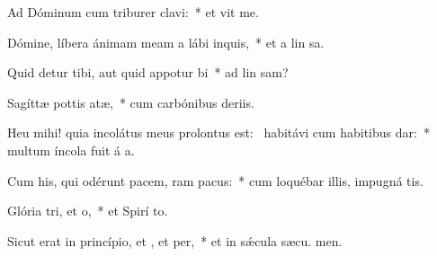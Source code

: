 \item Ad Dóminum cum triburer clavi:~* et vit me.
\item Dómine, líbera ánimam meam a lábi inquis,~* et a lin sa.
\item Quid detur tibi, aut quid appotur bi~* ad lin sam?
\item Sagíttæ pottis atæ,~* cum carbónibus deriis.
\item Heu mihi! quia incolátus meus prolontus est:~\pscross{} habitávi cum habitibus dar:~* multum íncola fuit á a.
\item Cum his, qui odérunt pacem, ram pacus:~* cum loquébar illis, impugná  tis.
\item Glória tri, et o,~* et Spirí to.
\item Sicut erat in princípio, et , et per,~* et in sǽcula sæcu. men.
